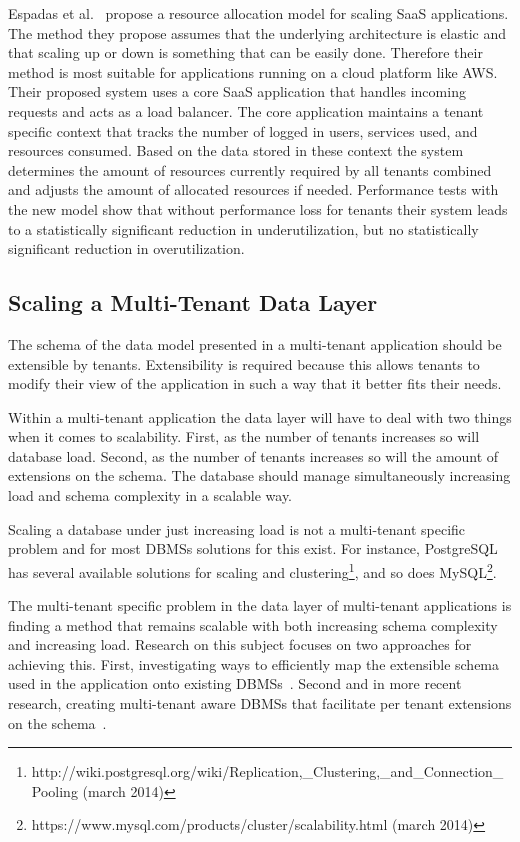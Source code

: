Espadas et al.~\cite{espadas2013tenant} propose a resource allocation model for scaling SaaS applications.
The method they propose assumes that the underlying architecture is elastic and that scaling up or down is something that can be easily done.
Therefore their method is most suitable for applications running on a cloud platform like \ac{AWS}. 
Their proposed system uses a core SaaS application that handles incoming requests and acts as a load balancer. The core application maintains a tenant specific context that tracks the number of logged in users, services used, and resources consumed.
Based on the data stored in these context the system determines the amount of resources currently required by all tenants combined and adjusts the amount of allocated resources if needed.
Performance tests with the new model show that without performance loss for tenants their system leads to a statistically significant reduction in underutilization, but no statistically significant reduction in overutilization. 


\subsection{Scaling a Multi-Tenant Data Layer}
The schema of the data model presented in a multi-tenant application should be extensible by tenants.
Extensibility is required because this allows tenants to modify their view of the application in such a way that it better fits their needs.

Within a multi-tenant application the data layer will have to deal with two things when it comes to scalability.
First, as the number of tenants increases so will database load.
Second, as the number of tenants increases so will the amount of extensions on the schema.
The database should  manage simultaneously increasing load and schema complexity in a scalable way.

Scaling a database under just increasing load is not a multi-tenant specific problem and for most \acp{DBMS} solutions for this exist. 
For instance, PostgreSQL has several available solutions for scaling and clustering\footnote{http://wiki.postgresql.org/wiki/Replication,\_Clustering,\_and\_Connection\_Pooling (march 2014)}, and so does MySQL\footnote{https://www.mysql.com/products/cluster/scalability.html (march 2014)}.

The multi-tenant specific problem in the data layer of multi-tenant applications is finding a method that remains scalable with both increasing schema complexity and increasing load.
Research on this subject focuses on two approaches for achieving this.
First, investigating ways to efficiently map the extensible schema used in the application onto existing \acp{DBMS}~\cite{aulbach2008multi, aulbach2009comparison}.
Second and in more recent research, creating multi-tenant aware \acp{DBMS} that facilitate per tenant extensions on the schema~\cite{schiller2011native, aulbach2011extensibility}.

